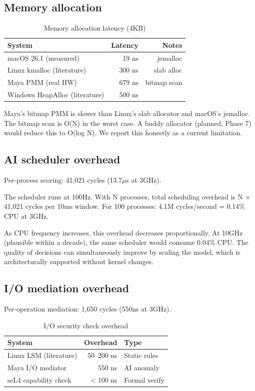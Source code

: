\documentclass[letterpaper,twocolumn,10pt]{article}
\begin{document}
\subsection{Memory allocation}

\begin{table}[h]
\centering
\caption{Memory allocation latency (4KB)}
\label{tab:mem}
\begin{tabular}{lrr}
\toprule
System & Latency & Notes \\
\midrule
macOS 26.1 (measured) & 19 ns & jemalloc \\
Linux kmalloc (literature) & 300 ns & slab alloc \\
Maya PMM (real HW) & 679 ns & bitmap scan \\
Windows HeapAlloc (literature) & 500 ns & \\
\bottomrule
\end{tabular}
\end{table}

Maya's bitmap PMM is slower than Linux's slab
allocator and macOS's jemalloc. The bitmap
scan is O(N) in the worst case. A buddy
allocator (planned, Phase 7) would reduce
this to O(log N). We report this honestly
as a current limitation.

\subsection{AI scheduler overhead}

Per-process scoring: 41,021 cycles (13.7$\mu$s
at 3GHz).

The scheduler runs at 100Hz. With N processes,
total scheduling overhead is N $\times$ 41,021
cycles per 10ms window. For 100 processes:
4.1M cycles/second = 0.14\% CPU at 3GHz.

As CPU frequency increases, this overhead
decreases proportionally. At 10GHz (plausible
within a decade), the same scheduler would
consume 0.04\% CPU. The quality of decisions
can simultaneously improve by scaling the
model, which is architecturally supported
without kernel changes.

\subsection{I/O mediation overhead}

Per-operation mediation: 1,650 cycles (550ns
at 3GHz).

\begin{table}[h]
\centering
\caption{I/O security check overhead}
\label{tab:security}
\begin{tabular}{lrl}
\toprule
System & Overhead & Type \\
\midrule
Linux LSM (literature) & 50--200 ns & Static rules \\
Maya I/O mediator & 550 ns & AI anomaly \\
seL4 capability check & $<$100 ns & Formal verify \\
\bottomrule
\end{tabular}
\end{table}
\end{document}
